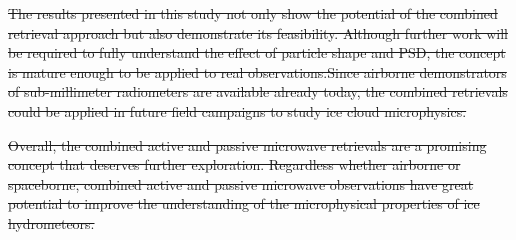\documentclass[journal abbreviation, manuscript]{copernicus}
\providecommand{\DIFdel}[1]{{\protect\color{red}\sout{#1}}}                      %
\providecommand{\DIFaddbegin}{} %
\providecommand{\DIFaddend}{} %
\providecommand{\DIFdelbegin}{} %
\providecommand{\DIFdelend}{} %
\begin{document}
\DIFdel{The results presented in this study not only show the potential of the combined
retrieval approach but also demonstrate its feasibility.
Although further work
will be required to fully understand the effect of particle shape and PSD, the concept is mature enough to be applied to real observations.Since airborne
demonstrators of sub-millimeter radiometers are available already today,
the combined retrievals could be applied in future field campaigns to study ice
cloud microphysics. }%

\DIFdel{Overall, the combined active and passive microwave retrievals are a promising
concept that deserves further exploration. Regardless whether airborne or
spaceborne, combined active and passive microwave observations have great
potential to improve the understanding of the microphysical properties of ice
hydrometeors.
}%

\DIFdelend %






\DIFdelbegin %
\DIFdelend \DIFaddbegin \clearpage
\appendix
\DIFaddend 
\end{document}
